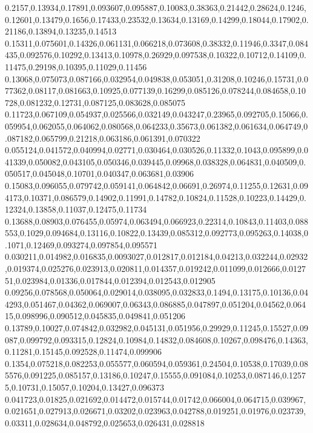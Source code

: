 0.2157,0.13934,0.17891,0.093607,0.095887,0.10083,0.38363,0.21442,0.28624,0.1246,0.12601,0.13479,0.1656,0.17433,0.23532,0.13634,0.13169,0.14299,0.18044,0.17902,0.21186,0.13894,0.13235,0.14513
0.15311,0.075601,0.14326,0.061131,0.066218,0.073608,0.38332,0.11946,0.3347,0.084435,0.092576,0.10292,0.13413,0.10978,0.26929,0.097538,0.10322,0.10712,0.14109,0.11475,0.29198,0.10395,0.11029,0.11456
0.13068,0.075073,0.087166,0.032954,0.049838,0.053051,0.31208,0.10246,0.15731,0.077362,0.08117,0.081663,0.10925,0.077139,0.16299,0.085126,0.078244,0.084658,0.10728,0.081232,0.12731,0.087125,0.083628,0.085075
0.11723,0.067109,0.054937,0.025566,0.032149,0.043247,0.23965,0.092705,0.15066,0.059954,0.062055,0.064062,0.080568,0.064233,0.35673,0.061382,0.061634,0.064749,0.087182,0.065799,0.21218,0.063186,0.061391,0.070322
0.055124,0.041572,0.040994,0.02771,0.030464,0.030526,0.11332,0.1043,0.095899,0.041339,0.050082,0.043105,0.050346,0.039445,0.09968,0.038328,0.064831,0.040509,0.050517,0.045048,0.10701,0.040347,0.063681,0.03906
0.15083,0.096055,0.079742,0.059141,0.064842,0.06691,0.26974,0.11255,0.12631,0.094173,0.10371,0.086579,0.14902,0.11991,0.14782,0.10824,0.11528,0.10223,0.14429,0.12324,0.13858,0.11037,0.12475,0.11734
0.13688,0.08903,0.076455,0.05974,0.063494,0.066923,0.22314,0.10843,0.11403,0.088553,0.1029,0.094684,0.13116,0.10822,0.13439,0.085312,0.092773,0.095263,0.14038,0.1071,0.12469,0.093274,0.097854,0.095571
0.030211,0.014982,0.016835,0.0093027,0.012817,0.012184,0.04213,0.032244,0.02932,0.019374,0.025276,0.023913,0.020811,0.014357,0.019242,0.011099,0.012666,0.012751,0.023984,0.01336,0.017844,0.012394,0.012543,0.012905
0.09256,0.078568,0.050064,0.029014,0.038095,0.032833,0.1494,0.13175,0.10136,0.044293,0.051467,0.04362,0.069007,0.06343,0.086885,0.047897,0.051204,0.04562,0.06415,0.098996,0.090512,0.045835,0.049841,0.051206
0.13789,0.10027,0.074842,0.032982,0.045131,0.051956,0.29929,0.11245,0.15527,0.09087,0.099792,0.093315,0.12824,0.10984,0.14832,0.084608,0.10267,0.098476,0.14363,0.11281,0.15145,0.092528,0.11474,0.099906
0.1354,0.075218,0.082253,0.055577,0.060594,0.059361,0.24504,0.10538,0.17039,0.085576,0.091225,0.085157,0.13186,0.10247,0.15555,0.091084,0.10253,0.087146,0.12575,0.10731,0.15057,0.10204,0.13427,0.096373
0.041723,0.01825,0.021692,0.014472,0.015744,0.01742,0.066004,0.064715,0.039967,0.021651,0.027913,0.026671,0.03202,0.023963,0.042788,0.019251,0.01976,0.023739,0.03311,0.028634,0.048792,0.025653,0.026431,0.028818
